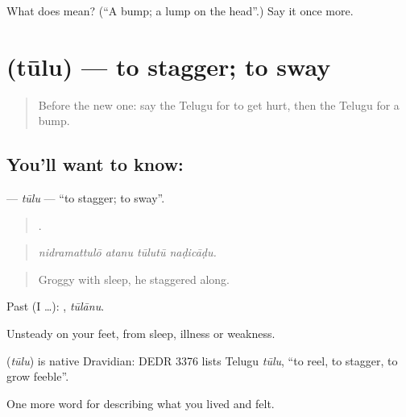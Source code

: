 \begin{tcolorbox}[breakable,colback=teal!4,colframe=teal!35!black,title={Before you move on}]
What does  mean? (\textquotedblleft{}A bump; a lump on the head\textquotedblright{}.) Say it once more.
\end{tcolorbox}
\section[\texorpdfstring{\te{తూలు} (tūlu)}{తూలు (tūlu)}]{ (tūlu) — to stagger; to sway}

\label{lesson:TE-C518-tulu}



\begin{quote}
Before the new one: say the Telugu for to get hurt, then the Telugu for a bump.
\end{quote}

\subsection*{You'll want to know: }
\textbf{} — \emph{tūlu} — \textquotedblleft{}to stagger; to sway\textquotedblright{}.

\begin{quote}
   .
\end{quote}

\begin{quote}
\emph{nidramattulō atanu tūlutū naḍicāḍu.}
\end{quote}

\begin{quote}
Groggy with sleep, he staggered along.
\end{quote}

Past (I …): , \emph{tūlānu}.

Unsteady on your feet, from sleep, illness or weakness.

\begin{cousinweb}
\textbf{} (\emph{tūlu}) is native Dravidian: DEDR 3376 lists Telugu \emph{tūlu}, \textquotedblleft{}to reel, to stagger, to grow feeble\textquotedblright{}.
\end{cousinweb}

\begin{grammarlens}[title={What you've built}]
One more word for describing what you lived and felt.
\end{grammarlens}

